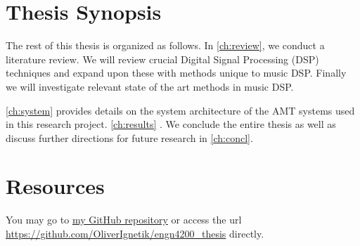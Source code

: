 \lipsum[1]

\section{Thesis Synopsis}

The rest of this thesis is organized as follows. 
In \autoref{ch:review}, we conduct a literature review. We will review crucial Digital Signal Processing (DSP) techniques and expand upon these with methods unique to music DSP. Finally we will investigate relevant state of the art methods in music DSP. 

\autoref{ch:system} provides details on the system architecture of the AMT systems used in this research project. 
\autoref{ch:results} . 
We conclude the entire thesis as well as discuss further directions for future research in \autoref{ch:concl}.

\section{Resources}

You may go to \href{https://github.com/OliverIgnetik/engn4200_thesis}{my GitHub repository} or access the url  \url{https://github.com/OliverIgnetik/engn4200_thesis} directly. 
